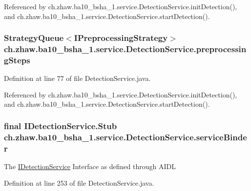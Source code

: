 Referenced by ch.zhaw.ba10\_\-bsha\_\-1.service.DetectionService.initDetection(), and ch.zhaw.ba10\_\-bsha\_\-1.service.DetectionService.startDetection().\hypertarget{classch_1_1zhaw_1_1ba10__bsha__1_1_1service_1_1DetectionService_a1cf989116feef3dca971827a4d16e56b}{
\subsubsection[{preprocessingSteps}]{\setlength{\rightskip}{0pt plus 5cm}StrategyQueue$<${\bf IPreprocessingStrategy}$>$ {\bf ch.zhaw.ba10\_\-bsha\_\-1.service.DetectionService.preprocessingSteps}}}
\label{classch_1_1zhaw_1_1ba10__bsha__1_1_1service_1_1DetectionService_a1cf989116feef3dca971827a4d16e56b}


Definition at line 77 of file DetectionService.java.

Referenced by ch.zhaw.ba10\_\-bsha\_\-1.service.DetectionService.initDetection(), and ch.zhaw.ba10\_\-bsha\_\-1.service.DetectionService.startDetection().\hypertarget{classch_1_1zhaw_1_1ba10__bsha__1_1_1service_1_1DetectionService_a9f24365c090a9ae586420e140fc97e0e}{
\subsubsection[{serviceBinder}]{\setlength{\rightskip}{0pt plus 5cm}final IDetectionService.Stub {\bf ch.zhaw.ba10\_\-bsha\_\-1.service.DetectionService.serviceBinder}}}
\label{classch_1_1zhaw_1_1ba10__bsha__1_1_1service_1_1DetectionService_a9f24365c090a9ae586420e140fc97e0e}
The \hyperlink{}{IDetectionService} Interface as defined through AIDL 

Definition at line 253 of file DetectionService.java.


